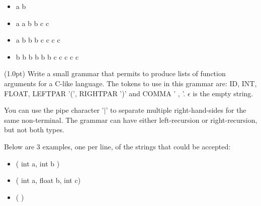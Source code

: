 \begin{itemize}
\item
a b
\item
a a b b c c
\item
a b b b c c c c
\item
b b b b b b c c c c c
\end{itemize}

\vspace{1in}


\noindent
(1.0pt) 
Write a small grammar that permits to produce lists of function arguments for a C-like language.  
The tokens to use in this grammar are: ID, INT, FLOAT, LEFTPAR '(', RIGHTPAR ')' and COMMA ' , '. $\epsilon$ is the empty string.

\noindent
You can use the pipe character '$|$' to separate multiple right-hand-sides for the same non-terminal.
The grammar can have either left-recursion or right-recursion, but not both types.

Below are 3 examples, one per line, of the strings that could  be accepted:

\begin{itemize}
\item
( int a, int b )

\item
( int a, float b, int c)

\item
( )
\end{itemize}

\vspace{2in}

